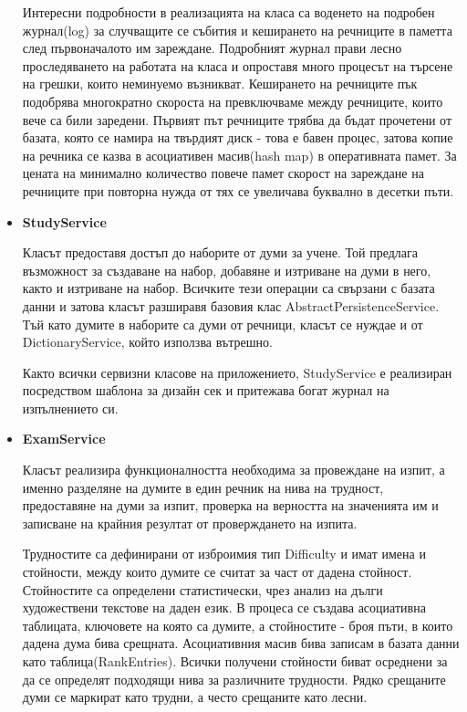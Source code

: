 \begin{itemize}
    Интересни подробности в реализацията на класа са воденето на
    подробен журнал(log) за случващите се събития и кеширането на
    речниците в паметта след първоначалото им зареждане. Подробният
    журнал прави лесно проследяването на работата на класа и опроставя
    много процесът на търсене на грешки, които неминуемо
    възникват. Кеширането на речниците пък подобрява многократно
    скороста на превключваме между речниците, които вече са били
    заредени. Първият път речниците трябва да бъдат прочетени от
    базата, която се намира на твърдият диск - това е бавен процес,
    затова копие на речника се казва в асоциативен масив(hash map) в
    оперативната памет. За цената на минимално количество повече памет
    скорост на зареждане на речниците при повторна нужда от тях се
    увеличава буквално в десетки пъти.
  \item \textbf{StudyService}

    Класът предоставя достъп до наборите от думи за учене. Той
    предлага възможност за създаване на набор, добавяне и изтриване на
    думи в него, както и изтриване на набор. Всичките тези операции са
    свързани с базата данни и затова класът разширавя базовия клас
    AbstractPersistenceService. Тъй като думите в наборите са думи от
    речници, класът се нуждае и от DictionaryService, който използва
    вътрешно.

    Както всички сервизни класове на приложението, StudyService е
    реализиран посредством шаблона за дизайн сек и притежава богат
    журнал на изпълнението си.
  \item \textbf{ExamService}

    Класът реализира функционалността необходима за провеждане на
    изпит, а именно разделяне на думите в един речник на нива на
    трудност, предоставяне на думи за изпит, проверка на верността на
    значенията им и записване на крайния резултат от проверждането на
    изпита. 

    Трудностите са дефинирани от изброимия тип Difficulty и имат имена
    и стойности, между които думите се считат за част от дадена
    стойност. Стойностите са определени статистически, чрез анализ на
    дълги художествени текстове на даден език. В процеса се създава
    асоциативна таблицата, ключовете на която са думите, а стойностите
    - броя пъти, в които дадена дума бива срещната. Асоциативния масив
    бива записам в базата данни като таблица(RankEntries). Всички
    получени стойности биват осреднени за да се определят подходящи
    нива за различните трудности. Рядко срещаните думи се маркират
    като трудни, а често срещаните като лесни.


\end{itemize}
